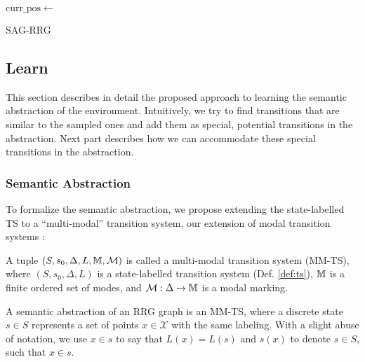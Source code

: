 \begin{algorithm}[t]
{{{		    }
		}\label{sagrrg:while_end}
		 \label{sagrrg:learn}\;
		$\mathrm{curr\_pos} \gets $ \Move{} \label{sagrrg:move}\;
	}
    \caption{SAG-RRG}
    \label{alg:SAGRRG}
\end{algorithm}


\subsection{Learn}
\label{sec:learn}
This section describes in detail the proposed approach to learning the semantic abstraction of the environment. Intuitively, we try to find transitions that are similar to the sampled ones and add them as special, potential transitions in the abstraction.
Next part describes how we can accommodate these special transitions in the abstraction.

\subsubsection{Semantic Abstraction}

To formalize the semantic abstraction, we propose extending the state-labelled TS to a ``multi-modal'' transition system, our extension of modal transition systems \cite{LT88}:

\begin{definition}
A tuple $(S,s_0,\Delta,L,\mathbb{M},\mathcal{M})$ is called a multi-modal transition system (MM-TS), where $(S,s_0,\Delta, L)$ is a state-labelled transition system (Def. \ref{def:ts}), $\mathbb{M}$ is a finite ordered set of modes, and $\mathcal{M}: \Delta \rightarrow \mathbb{M}$ is a modal marking. 
\end{definition}

A semantic abstraction of an RRG graph is an MM-TS, where a discrete state $s \in S$ represents a set of points $x \in \mathcal X$ with the same labeling. 
With a slight abuse of notation, we use $x \in s$ to say that $L(x) = L(s)$ and $s(x)$ to denote $s \in S$, such that $x \in s$.

